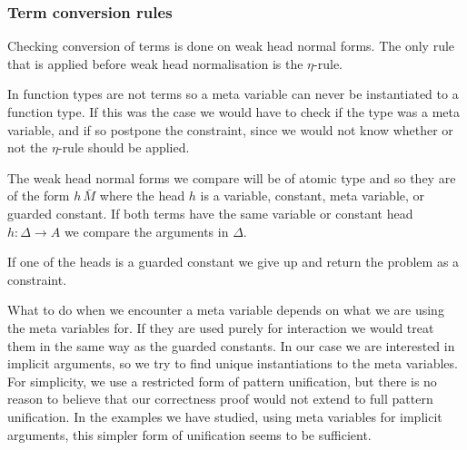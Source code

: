 \subsubsection{Term conversion rules}

Checking conversion of terms is done on weak head normal forms. The only rule
that is applied before weak head normalisation is the $\eta$-rule.


In {\Core} function types are not terms so a meta variable can never be
instantiated to a function type. If this was the case we would have to check if
the type was a meta variable, and if so postpone the constraint, since we would
not know whether or not the $\eta$-rule should be applied.

The weak head normal forms we compare will be of atomic type and so they are of
the form $h\,\bar M$ where the head $h$ is a variable, constant, meta variable,
or guarded constant. If both terms have the same variable or constant head $h :
\Delta \to A$ we compare the arguments in $\Delta$.


If one of the heads is a guarded constant we give up and return the problem as
a constraint.


What to do when we encounter a meta variable depends on what we are using the
meta variables for. If they are used purely for interaction we would treat them
in the same way as the guarded constants. In our case we are interested in
implicit arguments, so we try to find unique instantiations to the meta
variables. For simplicity, we use a restricted form of pattern
unification, but there is no
reason to believe that our correctness proof would not extend to full pattern
unification. In the examples we have studied, using meta variables for implicit
arguments, this simpler form of unification seems to be sufficient.

